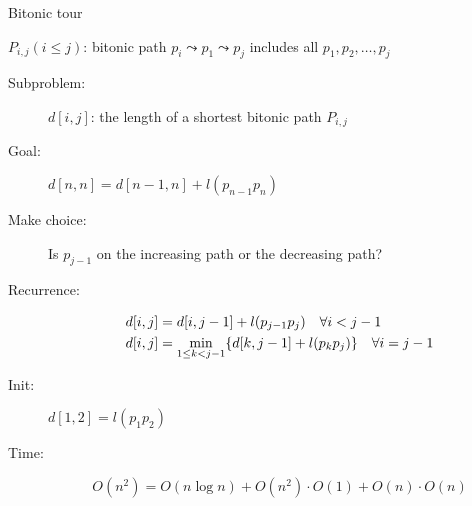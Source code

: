 \begin{frame}{Bitonic tour}
  \centerline{$P_{i,j} (i \le j)$: bitonic path $p_i \leadsto p_1 \leadsto p_j$ includes all $p_1, p_2, \dots, p_j$}

  \vspace{0.20cm}
  \begin{description}
	\item[Subproblem:] $d[i,j]$: the length of a shortest bitonic path $P_{i,j}$
	\item[Goal:] $d[n,n] = d[n-1, n] + l(p_{n-1}p_{n})$
	  \pause
	\item[Make choice:] Is $p_{j-1}$ on the increasing path or the decreasing path?
	\item[Recurrence:] 
	  \begin{align*}
		d[i,j] &=  d[i,j-1] + l(p_{j-1}p_j) \quad \forall i < j-1 \\
		d[i,j] &= \min_{1 \le k < j-1} \{d[k, j-1] + l(p_kp_j)\} \quad \forall i = j-1
	  \end{align*}
	  \pause
	\item[Init:] $d[1,2] = l(p_1p_2)$
	\item[Time:] 
	  \[
		O(n^2) = O(n \log n) + O(n^2) \cdot O(1) + O(n) \cdot O(n)
	  \]
  \end{description}
\end{frame}
